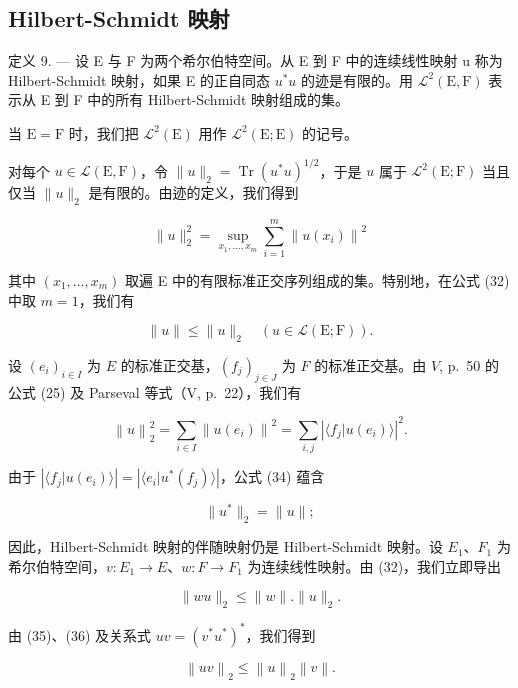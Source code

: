 \subsection{Hilbert-Schmidt 映射}

定义 9. --- 设 E 与 F 为两个希尔伯特空间。从 E 到 F 中的连续线性映射 u 称为 Hilbert-Schmidt 映射，如果 E 的正自同态 \(u^{*}u\) 的迹是有限的。用 \(\mathcal{L}^{2}(\mathrm{E},\mathrm{F})\) 表示从 E 到 F 中的所有 Hilbert-Schmidt 映射组成的集。

当 \(\mathrm{E} = \mathrm{F}\) 时，我们把 \(\mathcal{L}^2(\mathrm{E})\) 用作 \(\mathcal{L}^2(\mathrm{E};\mathrm{E})\) 的记号。

对每个 \(u \in \mathcal{L}(\mathrm{E},\mathrm{F})\)，令 \(\| u \|_2 = \operatorname{Tr}(u^* u)^{1/2}\)，于是 \(u\) 属于 \(\mathcal{L}^2(\mathrm{E};\mathrm{F})\) 当且仅当 \(\| u \|_2\) 是有限的。由迹的定义，我们得到

\[
\| u \| _ {2} ^ {2} = \sup _ {x _ {1}, \dots , x _ {m}} \sum_ {i = 1} ^ {m} \left\| u (x _ {i}) \right\| ^ {2}\tag{32}
\]

其中 \((x_{1},\ldots ,x_{m})\) 取遍 E 中的有限标准正交序列组成的集。特别地，在公式 (32) 中取 \(m = 1\)，我们有

\[
\| u \| \leqslant \| u \| _ {2} \quad (u \in \mathscr {L} (\mathrm{E}; \mathrm{F})).\tag{33}
\]

设 \((e_i)_{i\in I}\) 为 \(E\) 的标准正交基，\((f_j)_{j\in J}\) 为 \(F\) 的标准正交基。由 \(V\), p.~50 的公式 (25) 及 Parseval 等式（V, p.~22），我们有

\[
\left\| u \right\| _ {2} ^ {2} = \sum_ {i \in I} \left\| u (e _ {i}) \right\| ^ {2} = \sum_ {i, j} \left| \langle f _ {j} | u (e _ {i}) \rangle \right| ^ {2}.\tag{34}
\]

由于 \(\left|\langle f_j | u(e_i) \rangle\right| = \left|\langle e_i | u^*(f_j) \rangle\right|\)，公式 (34) 蕴含

\[
\| u ^ {*} \| _ {2} = \| u \|;\tag{35}
\]

因此，Hilbert-Schmidt 映射的伴随映射仍是 Hilbert-Schmidt 映射。设 \(E_{1}\)、\(F_{1}\) 为希尔伯特空间，\(v: E_{1} \to E\)、\(w: F \to F_{1}\) 为连续线性映射。由 (32)，我们立即导出

\[
\| w u \| _ {2} \leqslant \| w \|. \| u \| _ {2}.\tag{36}
\]

由 (35)、(36) 及关系式 \(uv = (v^{*}u^{*})^{*}\)，我们得到

\[
\left\| u v \right\| _ {2} \leqslant \left\| u \right\| _ {2} \left\| v \right\|.\tag{37}
\]

